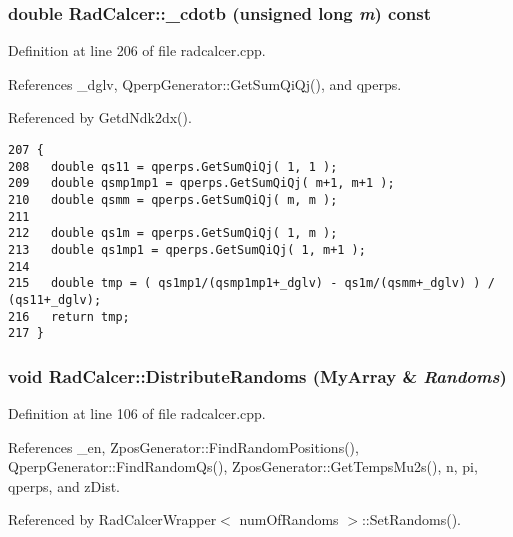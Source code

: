 \subsubsection{\setlength{\rightskip}{0pt plus 5cm}double RadCalcer::\_\-cdotb (unsigned long {\em m}) const\hspace{0.3cm}{\tt  [private]}}\label{classRadCalcer_9d1b2bef2d32ed924de8a5bd0aaf748f}




Definition at line 206 of file radcalcer.cpp.

References \_\-dglv, QperpGenerator::GetSumQiQj(), and qperps.

Referenced by GetdNdk2dx().

\begin{Code}\begin{verbatim}207 {
208   double qs11 = qperps.GetSumQiQj( 1, 1 );
209   double qsmp1mp1 = qperps.GetSumQiQj( m+1, m+1 );
210   double qsmm = qperps.GetSumQiQj( m, m );
211 
212   double qs1m = qperps.GetSumQiQj( 1, m );
213   double qs1mp1 = qperps.GetSumQiQj( 1, m+1 );
214 
215   double tmp = ( qs1mp1/(qsmp1mp1+_dglv) - qs1m/(qsmm+_dglv) ) / (qs11+_dglv);
216   return tmp;
217 }
\end{verbatim}
\end{Code}


\subsubsection{\setlength{\rightskip}{0pt plus 5cm}void RadCalcer::DistributeRandoms (MyArray \& {\em Randoms})}\label{classRadCalcer_fbd62b63a05b0ee23a4a2fcb26b1ac6c}




Definition at line 106 of file radcalcer.cpp.

References \_\-en, ZposGenerator::FindRandomPositions(), QperpGenerator::FindRandomQs(), ZposGenerator::GetTempsMu2s(), n, pi, qperps, and zDist.

Referenced by RadCalcerWrapper$<$ numOfRandoms $>$::SetRandoms().


